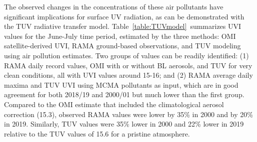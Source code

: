 \documentclass[10pt]{article}
\begin{document}
The observed changes in the concentrations of these air pollutants have
significant implications for surface UV radiation, as can be
demonstrated with the TUV radiative transfer model.
Table~{\ref{table:TUVmodel}}~summarizes UVI values for
the June-July time period, estimated by the three methods: OMI
satellite-derived UVI, RAMA ground-based observations, and TUV modeling
using air pollution estimates. Two groups of values can be readily
identified: (1) RAMA daily record values, OMI with or without BL
aerosols, and TUV for very clean conditions, all with UVI values around
15-16; and (2) RAMA average daily maxima and TUV UVI using MCMA
pollutants as input, which are in good agreement for both 2018/19 and
2000/01 but much lower than the first group. Compared to the OMI
estimate that included the climatological aerosol correction (15.3),
observed RAMA values were lower by 35\% in 2000 and by 20\% in 2019.
Similarly, TUV values were 35\% lower in 2000 and 22\% lower in 2019
relative to the TUV values of 15.6 for a pristine atmosphere.
\end{document}
